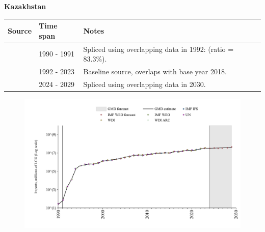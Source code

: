 \documentclass[12pt,a4paper,landscape]{article}
\begin{document}
\begin{adjustbox}{max totalsize={\paperwidth}{\paperheight},center}
\begin{minipage}[t][\textheight][t]{\textwidth}
\vspace*{0.5cm}
{}
\begin{center}
{\Large\bfseries Kazakhstan}
\end{center}
\vspace{0.5cm}
\begin{table}[H]
\centering
\small
\begin{tabular}{|l|l|l|}
\hline
\textbf{Source} & \textbf{Time span} & \textbf{Notes} \\
\hline
\rowcolor{white}\cite{UN}& 1990 - 1991 &Spliced using overlapping data in 1992: (ratio = 83.3\%).\\
\rowcolor{lightgray}\cite{WDI}& 1992 - 2023 &Baseline source, overlaps with base year 2018.\\
\rowcolor{white}\cite{IMF_WEO_forecast}& 2024 - 2029 &Spliced using overlapping data in 2030.\\
\hline
\end{tabular}
\end{table}
\begin{figure}[H]
\centering
\includegraphics[width=\textwidth,height=0.6\textheight,keepaspectratio]{graphs/KAZ_imports.pdf}
\end{figure}
\end{minipage}
\end{adjustbox}
\end{document}

